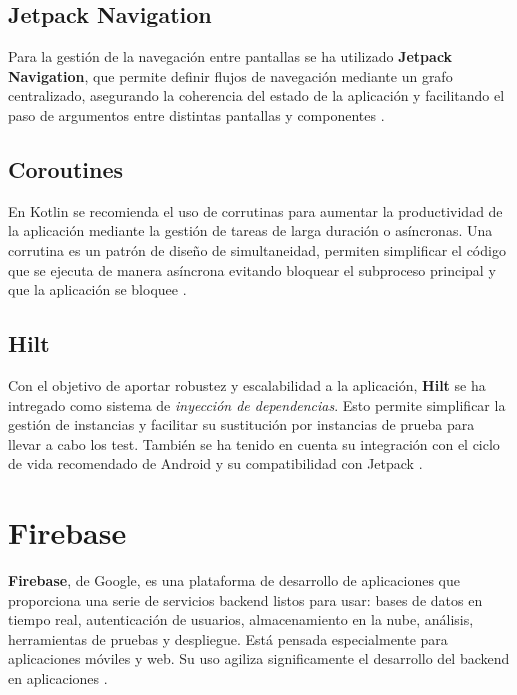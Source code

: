 \subsection{Jetpack Navigation}

Para la gestión de la navegación entre pantallas se ha utilizado \textbf{Jetpack Navigation}, que permite definir flujos de navegación mediante un grafo centralizado, asegurando la coherencia del estado de la aplicación y facilitando el paso de argumentos entre distintas pantallas y componentes \cite{jetpack-navigation}.

\subsection{Coroutines}

En Kotlin se recomienda el uso de corrutinas para aumentar la productividad de la aplicación mediante la gestión de tareas de larga duración o asíncronas. Una corrutina es un patrón de diseño de simultaneidad, permiten simplificar el código que se ejecuta de manera asíncrona evitando bloquear el subproceso principal y que la aplicación se bloquee \cite{android-coroutines}.

\subsection{Hilt}

Con el objetivo de aportar robustez y escalabilidad a la aplicación, \textbf{Hilt} se ha intregado como sistema de \textit{inyección de dependencias}. Esto permite simplificar la gestión de instancias y facilitar su sustitución por instancias de prueba para llevar a cabo los test. También se ha tenido en cuenta su integración con el ciclo de vida recomendado de Android y su compatibilidad con Jetpack \cite{hilt}.

\section{Firebase}

\textbf{Firebase}, de Google, es una plataforma de desarrollo de aplicaciones que proporciona una serie de servicios backend listos para usar: bases de datos en tiempo real, autenticación de usuarios, almacenamiento en la nube, análisis, herramientas de pruebas y despliegue. Está pensada especialmente para aplicaciones móviles y web. Su uso agiliza significamente el desarrollo del backend en aplicaciones \cite{firebase}.

